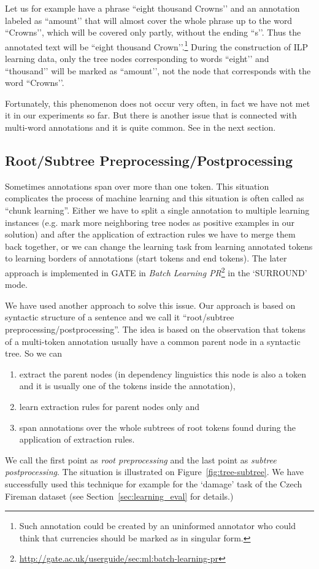 
Let us for example have a phrase ``eight thousand Crowns’’ and an annotation labeled as ``amount’’ that will almost cover the whole phrase up to the word ``Crowns’’, which will be covered only partly, without the ending ``s’’. Thus the annotated text will be ``eight thousand Crown’’.\footnote{Such annotation could be created by an uninformed annotator who could think that currencies should be marked as in singular form.} During the construction of ILP learning data, only the tree nodes corresponding to words ``eight’’ and ``thousand’’ will be marked as ``amount’’, not the node that corresponds with the word ``Crowns’’.

Fortunately, this phenomenon does not occur very often, in fact we have not met it in our experiments so far. But there is another issue that is connected with multi-word annotations and it is quite common. See in the next section.


\subsection{Root/Subtree Preprocessing/Postprocessing} \label{sec:learning_root_subtree}
Sometimes annotations span over more than one token. This situation complicates the process of machine learning and this situation is often called as ``chunk learning''. Either we have to split a single annotation to multiple learning instances (e.g. mark more neighboring tree nodes as positive examples in our solution) and after the application of extraction rules we have to merge them back together, or we can change the learning task from learning annotated tokens to learning borders of annotations (start tokens and end tokens). The later approach is implemented in GATE in \emph{Batch Learning PR}\footnote{\url{http://gate.ac.uk/userguide/sec:ml:batch-learning-pr}} in the `SURROUND' mode.

We have used another approach to solve this issue. Our approach is based on syntactic structure of a sentence and we call it ``root/subtree preprocessing/postprocessing''. The idea is based on the observation that tokens of a multi-token annotation usually have a common parent node in a syntactic tree. So we can
\begin{enumerate}
	\item extract the parent nodes (in dependency linguistics this node is also a token and it is usually one of the tokens inside the annotation), 
	\item learn extraction rules for parent nodes only and 
	\item span annotations over the whole subtrees of root tokens found during the application of extraction rules.
\end{enumerate}
We call the first point as \emph{root preprocessing} and the last point as \emph{subtree postprocessing}. The situation is illustrated on Figure~\ref{fig:tree-subtree}. We have successfully used this technique for example for the `damage' task of the Czech Fireman dataset (see Section~\ref{sec:learning_eval} for details.)

